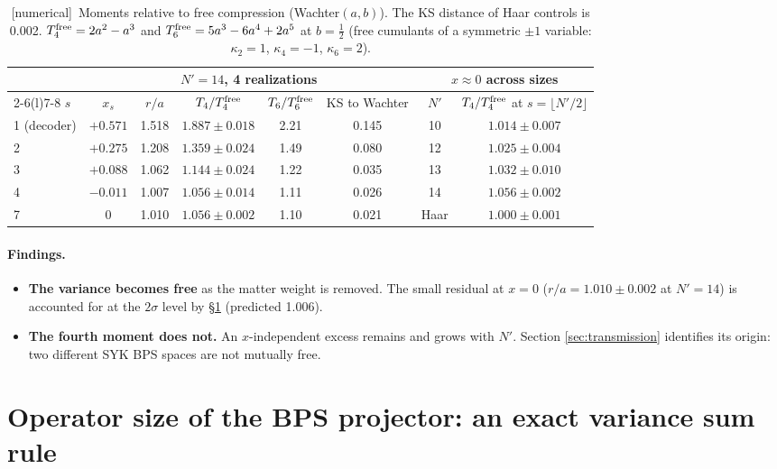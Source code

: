 \documentclass[11pt]{article}
\newcommand{\Np}{N'}
\newcommand{\tagbox}[2]{\textsf{\small\color{#1}[#2]}}
\newcommand{\NUM}{\tagbox{cnum}{numerical}}
\theoremstyle{remark}
\begin{document}
\begin{table}[h]
\centering\small
\begin{tabular}{@{}lccccccc@{}}
\toprule
& \multicolumn{5}{c}{$\Np=14$, 4 realizations} & \multicolumn{2}{c}{$x\approx0$ across sizes}\\
\cmidrule(lr){2-6}\cmidrule(l){7-8}
$s$ & $x_s$ & $r/a$ & $T_4/T_4^{\rm free}$ & $T_6/T_6^{\rm free}$ & KS to Wachter & $\Np$ & $T_4/T_4^{\rm free}$ at $s=\lfloor \Np/2\rfloor$\\
\midrule
1 (decoder) & $+0.571$ & 1.518 & $1.887\pm0.018$ & 2.21 & 0.145 & 10 & $1.014\pm0.007$\\
2 & $+0.275$ & 1.208 & $1.359\pm0.024$ & 1.49 & 0.080 & 12 & $1.025\pm0.004$\\
3 & $+0.088$ & 1.062 & $1.144\pm0.024$ & 1.22 & 0.035 & 13 & $1.032\pm0.010$\\
4 & $-0.011$ & 1.007 & $1.056\pm0.014$ & 1.11 & 0.026 & 14 & $1.056\pm0.002$\\
7 & 0 & 1.010 & $1.056\pm0.002$ & 1.10 & 0.021 & Haar & $1.000\pm0.001$\\
\bottomrule
\end{tabular}
\caption{\NUM\ Moments relative to free compression (Wachter$(a,b)$). The KS distance of Haar controls is 0.002.
$T_4^{\rm free}=2a^2-a^3$ and $T_6^{\rm free}=5a^3-6a^4+2a^5$ at $b=\frac12$ (free cumulants of a symmetric $\pm1$
variable: $\kappa_2=1$, $\kappa_4=-1$, $\kappa_6=2$).}
\label{tab:family}
\end{table}

\paragraph{Findings.}
\begin{itemize}\itemsep1pt
\item \textbf{The variance becomes free} as the matter weight is removed. The small residual at $x=0$
  ($r/a=1.010\pm0.002$ at $\Np=14$) is accounted for at the $2\sigma$ level by \S\ref{sec:size} (predicted 1.006).
\item \textbf{The fourth moment does not.} An $x$-independent excess remains and grows with $\Np$. Section
  \ref{sec:transmission} identifies its origin: two different SYK BPS spaces are not mutually free.
\end{itemize}

\section{Operator size of the BPS projector: an exact variance sum rule}\label{sec:size}
\end{document}
